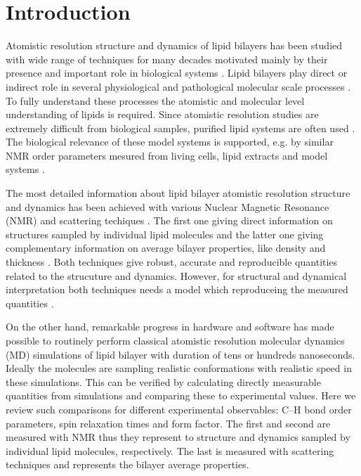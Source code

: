 \documentclass[aps,prl,superscriptaddress,twocolumn]{revtex4}
\begin{document}

\maketitle %



\section{Introduction}
Atomistic resolution structure and dynamics of lipid bilayers has been studied
with wide range of techniques for many decades motivated mainly
by their presence and important role in biological systems \cite{??}.
Lipid bilayers play direct or indirect role in several physiological and pathological
molecular scale processes \cite{??}. To fully understand these processes the atomistic and
molecular level understanding of lipids is required. Since atomistic resolution studies are
extremely difficult from biological samples, purified lipid systems are often used \cite{??}.
The biological relevance of these model systems is supported, e.g. by similar NMR order parameters 
mesured from living cells, lipid extracts and model systems \cite{??}. 

The most detailed information about lipid bilayer atomistic resolution structure and dynamics has been
achieved with various Nuclear Magnetic Resonance (NMR) and scattering techiques \cite{??}. 
The first one giving direct information on structures sampled by individual lipid molecules \cite{??} and
the latter one giving complementary information on average bilayer properties, like density and thickness \cite{??}.
Both techniques give robust, accurate and reproducible quantities related to the strucuture and dynamics.
However, for structural and dynamical interpretation both techniques needs a model which reproduceing 
the measured quantities \cite{??}. 

On the other hand, remarkable progress in hardware and software has made possible to 
routinely perform classical atomistic resolution molecular dynamics (MD) simulations of lipid bilayer with 
duration of tens or hundreds nanoseconds. Ideally the molecules are sampling realistic
conformations with realistic speed in these simulations. This can be verified by calculating
directly measurable quantities from simulations and comparing these to experimental values.
Here we review such comparisons for different experimental observables: C--H bond order parameters,
spin relaxation times and form factor. The first and second are measured with NMR thus they 
represent to structure and dynamics sampled by individual lipid molecules, respectively.
The last is measured with scattering techniques and represents the bilayer average properties.
\end{document}
